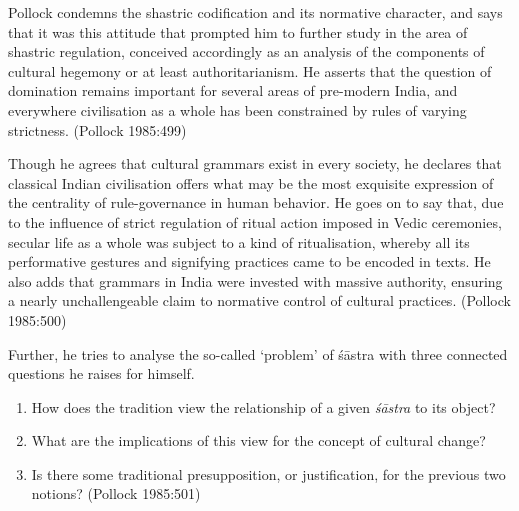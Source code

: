 Pollock condemns the shastric codification and its normative character, and says that it was this attitude that prompted him to further study in the area of shastric regulation, conceived accordingly as an analysis of the components of cultural hegemony or at least authoritarianism. He asserts that the question of domination remains important for several areas of pre-modern India, and everywhere civilisation as a whole has been constrained by rules of varying strictness. (Pollock 1985:499)

Though he agrees that cultural grammars exist in every society, he declares that classical Indian civilisation offers what may be the most exquisite expression of the centrality of rule-governance in human behavior. He goes on to say that, due to the influence of strict regulation of ritual action imposed in Vedic ceremonies, secular life as a whole was subject to a kind of ritualisation, whereby all its performative gestures and signifying practices came to be encoded in texts. He also adds that grammars in India were invested with massive authority, ensuring a nearly unchallengeable claim to normative control of cultural practices. (Pollock 1985:500)

Further, he tries to analyse the so-called `problem' of śāstra with three connected questions he raises for himself.
\begin{enumerate}
\item How does the tradition view the relationship of a given {\it śāstra} to its object?

\newpage

\item What are the implications of this view for the concept of cultural change?

\item Is there some traditional presupposition, or justification, for the previous two notions? (Pollock 1985:501)
\end{enumerate}

